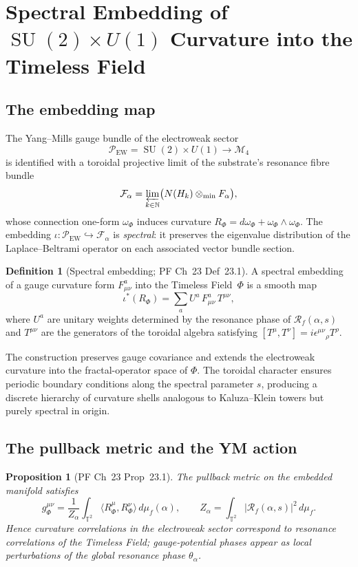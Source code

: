 \documentclass[11pt,a4paper]{article}
\theoremstyle{plain}
\newtheorem{proposition}[theorem]{Proposition}
\theoremstyle{definition}
\newtheorem{definition}[theorem]{Definition}
\DeclareMathOperator{\SU}{SU}
\newcommand{\N}{\mathbb{N}}
\newcommand{\Rf}{\mathcal{R}_f}
\begin{document}
\section{Spectral Embedding of \texorpdfstring{$\SU(2)\times U(1)$}{SU(2) x U(1)} Curvature into the Timeless Field}
\label{sec:spectral-embedding}

\subsection{The embedding map}

The Yang--Mills gauge bundle of the electroweak sector
\[
\mathcal{P}_{\mathrm{EW}} = \SU(2) \times U(1) \longrightarrow
\mathcal{M}_{4}
\]
is identified with a toroidal projective limit of the substrate's
resonance fibre bundle
\[
\mathcal{F}_{\alpha} = \varprojlim_{k \in \N}\bigl(N(H_{k})
\otimes_{\min} F_{\alpha}\bigr),
\]
whose connection one-form $\omega_{\Phi}$ induces curvature
$R_{\Phi} = d\omega_{\Phi} + \omega_{\Phi} \wedge \omega_{\Phi}$. The
embedding $\iota: \mathcal{P}_{\mathrm{EW}} \hookrightarrow
\mathcal{F}_{\alpha}$ is \emph{spectral}: it preserves the eigenvalue
distribution of the Laplace--Beltrami operator on each associated
vector bundle section.

\begin{definition}[Spectral embedding; PF Ch~23 Def~23.1]
\label{def:spectral-embedding}
A spectral embedding of a gauge curvature form $F^{a}_{\mu\nu}$ into
the Timeless Field~$\Phi$ is a smooth map
\[
\iota^{*}(R_{\Phi}) = \sum_{a} U^{a}\, F^{a}_{\mu\nu}\, T^{\mu\nu},
\]
where $U^{a}$ are unitary weights determined by the resonance phase of
$\Rf(\alpha, s)$ and $T^{\mu\nu}$ are the generators of the toroidal
algebra satisfying $[T^{\mu}, T^{\nu}] =
i\epsilon^{\mu\nu}{}_{\rho}T^{\rho}$.
\end{definition}

The construction preserves gauge covariance and extends the
electroweak curvature into the fractal-operator space of $\Phi$. The
toroidal character ensures periodic boundary conditions along the
spectral parameter $s$, producing a discrete hierarchy of curvature
shells analogous to Kaluza--Klein towers but purely spectral in
origin.

\subsection{The pullback metric and the YM action}

\begin{proposition}[PF Ch~23 Prop~23.1]
\label{prop:pullback-metric}
The pullback metric on the embedded manifold satisfies
\[
g_{\Phi}^{\mu\nu} = \frac{1}{Z_{\alpha}}
\int_{\mathbb{T}^{2}} \langle R_{\Phi}^{\mu}, R_{\Phi}^{\nu}\rangle\,
d\mu_{f}(\alpha),
\qquad
Z_{\alpha} = \int_{\mathbb{T}^{2}} |\Rf(\alpha, s)|^{2}\, d\mu_{f}.
\]
Hence curvature correlations in the electroweak sector correspond to
resonance correlations of the Timeless Field; gauge-potential phases
appear as local perturbations of the global resonance phase
$\theta_{\alpha}$.
\end{proposition}
\end{document}
